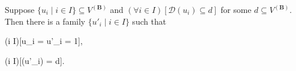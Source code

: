 Suppose $\{u_i \mid i \in I\} \subseteq V^{(\mathbf{B})}$ and $(\forall i \in I)[\mathcal{D}(u_i) \subseteq d]$ for some $d \subseteq V^{(\mathbf{B})}$. Then there is a family $\{u'_i \mid i \in I\}$ such that

\quad (\forall i \in I)[\llbracket u_i = u'_i \rrbracket = 1],

\quad (\forall i \in I)[(u'_i) = d].
